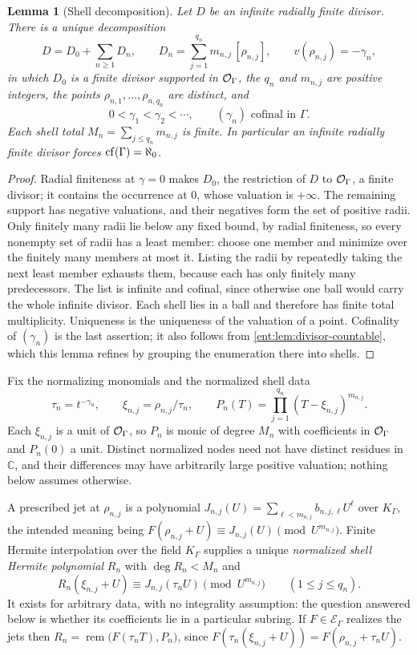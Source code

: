 \documentclass[11pt]{article}
\theoremstyle{plain}
\newtheorem{lemma}[lemma]{Lemma}
\theoremstyle{plain}
\theoremstyle{plain}
\theoremstyle{definition}
\theoremstyle{definition}
\theoremstyle{definition}
\theoremstyle{definition}
\theoremstyle{remark}
\newcommand{\C}{\mathbb C}\newcommand{\R}{\mathbb R}
\newcommand{\K}{K_\Gamma}\newcommand{\KD}{K_\Delta}
\newcommand{\E}{\mathcal E_\Gamma}
\DeclareMathOperator{\remp}{rem}\DeclareMathOperator{\Res}{Res}
\begin{document}
\begin{lemma}[Shell decomposition]\label{ent:lem:shells}
Let $D$ be an infinite radially finite divisor. There is a unique
decomposition
\[
 D=D_0+\sum_{n\ge1}D_n,\qquad
 D_n=\sum_{j=1}^{q_n}m_{n,j}\,[\rho_{n,j}],\qquad
 v(\rho_{n,j})=-\gamma_n,
\]
in which $D_0$ is a finite divisor supported in $\mathcal O_\Gamma$, the $q_n$ and
$m_{n,j}$ are positive integers, the points $\rho_{n,1},\ldots,\rho_{n,q_n}$
are distinct, and
\[
 0<\gamma_1<\gamma_2<\cdots,\qquad(\gamma_n)\text{ cofinal in }\Gamma.
\]
Each shell total $M_n=\sum_{j\le q_n}m_{n,j}$ is finite. In particular an
infinite radially finite divisor forces $\operatorname{cf}(\Gamma)=\aleph_0$.
\end{lemma}
\begin{proof}
Radial finiteness at $\gamma=0$ makes $D_0$, the restriction of $D$ to
$\mathcal O_\Gamma$, a finite divisor; it contains the occurrence at $0$, whose valuation
is $+\infty$. The remaining support has negative valuations, and their
negatives form the set of positive radii. Only finitely many radii lie below
any fixed bound, by radial finiteness, so every nonempty set of radii has a
least member: choose one member and minimize over the finitely many members
at most it. Listing the radii by repeatedly taking the next least member
exhausts them, because each has only finitely many predecessors. The list is
infinite and cofinal, since otherwise one ball would carry the whole infinite
divisor. Each shell lies in a ball and therefore has finite total
multiplicity. Uniqueness is the uniqueness of the valuation of a point.
Cofinality of $(\gamma_n)$ is the last assertion; it also follows from
\cref{ent:lem:divisor-countable}, which this lemma refines by grouping the
enumeration there into shells.
\end{proof}

Fix the normalizing monomials and the normalized shell data
\begin{equation}\label{ent:eq:shellpoly}
 \tau_n=t^{-\gamma_n},\qquad
 \xi_{n,j}=\rho_{n,j}/\tau_n,\qquad
 P_n(T)=\prod_{j=1}^{q_n}(T-\xi_{n,j})^{m_{n,j}} .
\end{equation}
Each $\xi_{n,j}$ is a unit of $\mathcal O_\Gamma$, so $P_n$ is monic of degree $M_n$ with
coefficients in $\mathcal O_\Gamma$ and $P_n(0)$ a unit. Distinct normalized nodes need not
have distinct residues in $\C$, and their differences may have arbitrarily
large positive valuation; nothing below assumes otherwise.

A prescribed jet at $\rho_{n,j}$ is a polynomial
$J_{n,j}(U)=\sum_{\ell<m_{n,j}}b_{n,j,\ell}U^\ell$ over $\K$, the intended
meaning being $F(\rho_{n,j}+U)\equiv J_{n,j}(U)\pmod{U^{m_{n,j}}}$. Finite
Hermite interpolation over the field $\K$ supplies a unique
\emph{normalized shell Hermite polynomial} $R_n$ with $\deg R_n<M_n$ and
\begin{equation}\label{ent:eq:normalizedjets}
 R_n(\xi_{n,j}+U)\equiv J_{n,j}(\tau_nU)\pmod{U^{m_{n,j}}}
 \qquad(1\le j\le q_n).
\end{equation}
It exists for arbitrary data, with no integrality assumption: the question
answered below is whether its coefficients lie in a particular subring. If
$F\in\E$ realizes the jets then $R_n=\remp\bigl(F(\tau_nT),P_n\bigr)$, since
$F(\tau_n(\xi_{n,j}+U))=F(\rho_{n,j}+\tau_nU)$.
\end{document}

